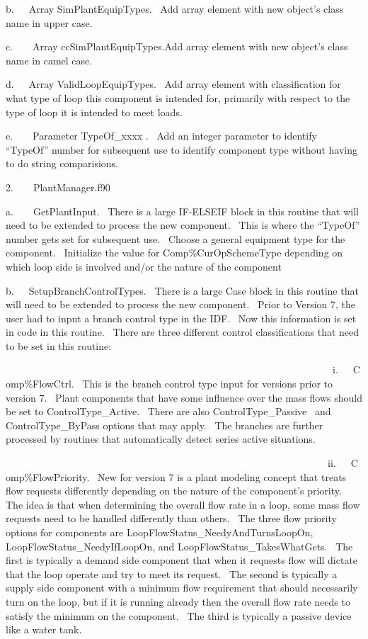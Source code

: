 b.~~~Array SimPlantEquipTypes.~ Add array element with new object's class name in upper case.

c.~~~~Array ccSimPlantEquipTypes.Add array element with new object's class name in camel case.

d.~~~Array ValidLoopEquipTypes.~ Add array element with classification for what type of loop this component is intended for, primarily with respect to the type of loop it is intended to meet loads.

e.~~~~Parameter TypeOf\_xxxx .~ Add an integer parameter to identify ``TypeOf'' number for subsequent use to identify component type without having to do string comparisions.

2.~~~~PlantManager.f90

a.~~~~GetPlantInput.~ There is a large IF-ELSEIF block in this routine that will need to be extended to process the new component.~ This is where the ``TypeOf'' number gets set for subsequent use.~ Choose a general equipment type for the component.~ Initialize the value for Comp\%CurOpSchemeType depending on which loop side is involved and/or the nature of the component

b.~~~SetupBranchControlTypes.~ There is a large Case block in this routine that will need to be extended to process the new component.~ Prior to Version 7, the user had to input a branch control type in the IDF.~ Now this information is set in code in this routine.~ There are three different control classifications that need to be set in this routine:

~~~~~~~~~~~~~~~~~~~~~~~~~~~~~~~~~~~~~~~~~~~~~~~~~~~~~~~~~~~~~~~~~~i.~~~Comp\%FlowCtrl.~ This is the branch control type input for versions prior to version 7.~ Plant components that have some influence over the mass flows should be set to ControlType\_Active.~ There are also ControlType\_Passive~ and ControlType\_ByPass options that may apply.~ The branches are further processed by routines that automatically detect series active situations.

~~~~~~~~~~~~~~~~~~~~~~~~~~~~~~~~~~~~~~~~~~~~~~~~~~~~~~~~~~~~~~~~~ii.~~~Comp\%FlowPriority.~ New for version 7 is a plant modeling concept that treats flow requests differently depending on the nature of the component's priority.~ The idea is that when determining the overall flow rate in a loop, some mass flow requests need to be handled differently than others.~ The three flow priority options for components are LoopFlowStatus\_NeedyAndTurnsLoopOn, LoopFlowStatus\_NeedyIfLoopOn, and LoopFlowStatus\_TakesWhatGets.~ The first is typically a demand side component that when it requests flow will dictate that the loop operate and try to meet its request.~ The second is typically a supply side component with a minimum flow requirement that should necessarily turn on the loop, but if it is running already then the overall flow rate needs to satisfy the minimum on the component.~ The third is typically a passive device like a water tank.

